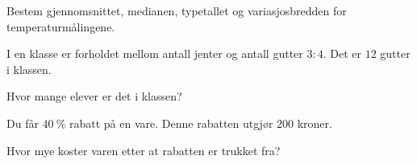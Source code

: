 Bestem gjennomsnittet, medianen, typetallet og variasjosbredden for
temperaturmålingene.


\Oppgave[1] 

I en klasse er forholdet mellom antall jenter og antall gutter $3:4$.
Det er $12$ gutter i klassen. \bigskip

Hvor mange elever er det i klassen?


\Oppgave[1] 

Du får $\SI{40}{\percent}$ rabatt på en vare. Denne rabatten utgjør $200$
kroner.\bigskip

Hvor mye koster varen etter at rabatten er trukket fra?


\Oppgave[1] 

\begin{figure}[H]
  \centering
  \caption{}
  \label{fig:del-1-oppgave-4}
\end{figure}

